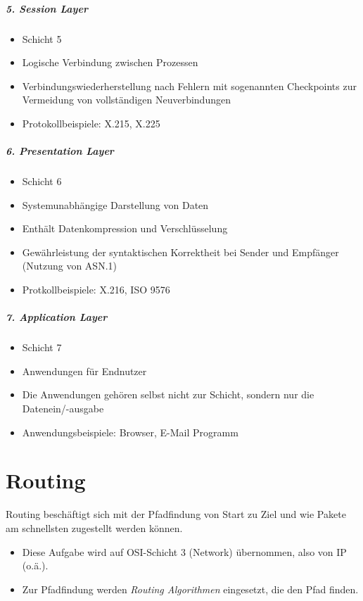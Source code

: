 	\paragraph{5. Session Layer}
		\begin{itemize}
			\item Schicht 5
			\item Logische Verbindung zwischen Prozessen
			\item Verbindungswiederherstellung nach Fehlern mit sogenannten Checkpoints zur Vermeidung von vollständigen Neuverbindungen
			\item Protokollbeispiele: X.215, X.225
		\end{itemize}

	\paragraph{6. Presentation Layer}
		\begin{itemize}
			\item Schicht 6
			\item Systemunabhängige Darstellung von Daten
			\item Enthält Datenkompression und Verschlüsselung
			\item Gewährleistung der syntaktischen Korrektheit bei Sender und Empfänger (Nutzung von ASN.1)
			\item Protkollbeispiele: X.216, ISO 9576
		\end{itemize}

	\paragraph{7. Application Layer}
		\begin{itemize}
			\item Schicht 7
			\item Anwendungen für Endnutzer
			\item Die Anwendungen gehören selbst nicht zur Schicht, sondern nur die Datenein/-ausgabe
			\item Anwendungsbeispiele: Browser, E-Mail Programm
		\end{itemize}

\chapter{Routing}
	Routing beschäftigt sich mit der Pfadfindung von Start zu Ziel und wie Pakete am schnellsten zugestellt werden können.
	\begin{itemize}
		\item Diese Aufgabe wird auf OSI-Schicht 3 (Network) übernommen, also von IP (o.ä.).
		\item Zur Pfadfindung werden \textit{Routing Algorithmen} eingesetzt, die den Pfad finden.
	\end{itemize}

